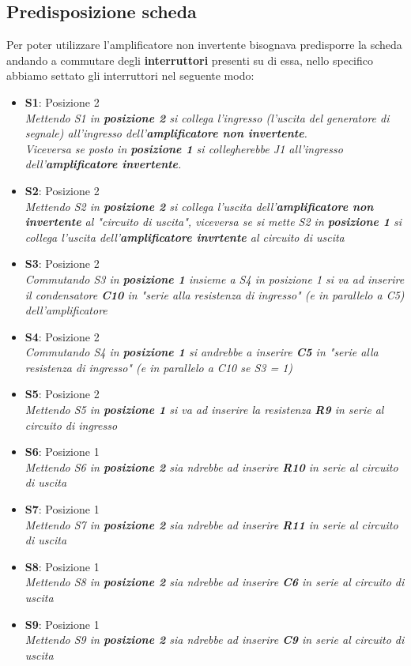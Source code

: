 \documentclass{article}
\begin{document}
\subsection{Predisposizione scheda}
Per poter utilizzare l'amplificatore non invertente bisognava predisporre la scheda andando a commutare degli \textbf{interruttori} presenti su di essa, nello specifico abbiamo settato gli interruttori nel seguente modo:
\begin{itemize}
    \item \textbf{S1}: Posizione 2\\ \textit{Mettendo S1 in \textbf{posizione 2} si collega l'ingresso (l'uscita del generatore di segnale) all'ingresso dell'\textbf{amplificatore non invertente}.\\Viceversa se posto in \textbf{posizione 1} si collegherebbe J1 all'ingresso dell'\textbf{amplificatore invertente}.}
    \item \textbf{S2}: Posizione 2\\ \textit{Mettendo S2 in \textbf{posizione 2} si collega l'uscita dell'\textbf{amplificatore non invertente} al "circuito di uscita", viceversa se si mette S2 in \textbf{posizione 1} si collega l'uscita dell'\textbf{amplificatore invrtente} al circuito di uscita}
    \item \textbf{S3}: Posizione 2\\ \textit{Commutando S3 in \textbf{posizione 1} insieme a S4 in posizione 1 si va ad inserire il condensatore \textbf{C10} in "serie alla resistenza di ingresso" (e in parallelo a C5) dell'amplificatore}
    \item \textbf{S4}: Posizione 2\\ \textit{Commutando S4 in \textbf{posizione 1} si andrebbe a inserire \textbf{C5} in "serie alla resistenza di ingresso" (e in parallelo a C10 se S3 = 1)}
    \item \textbf{S5}: Posizione 2\\\textit{Mettendo S5 in \textbf{posizione 1} si va ad inserire la resistenza \textbf{R9} in serie al circuito di ingresso}
    \item \textbf{S6}: Posizione 1\\ \textit{Mettendo S6 in \textbf{posizione 2} sia ndrebbe ad inserire \textbf{R10} in serie al circuito di uscita}
    \item \textbf{S7}: Posizione 1\\ \textit{Mettendo S7 in \textbf{posizione 2} sia ndrebbe ad inserire \textbf{R11} in serie al circuito di uscita}
    \item \textbf{S8}: Posizione 1\\ \textit{Mettendo S8 in \textbf{posizione 2} sia ndrebbe ad inserire \textbf{C6} in serie al circuito di uscita}
    \item \textbf{S9}: Posizione 1\\ \textit{Mettendo S9 in \textbf{posizione 2} sia ndrebbe ad inserire \textbf{C9} in serie al circuito di uscita}
\end{itemize}
\end{document}
